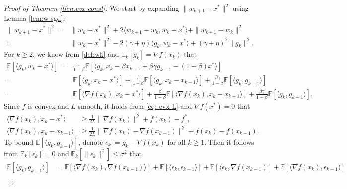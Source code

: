 \documentclass[10pt]{article}
\numberwithin{equation}{section}
\theoremstyle{definition}
\newcommand{\ebb}{\mathbb{E}}  %
\begin{document}
\begin{proof}[Proof of Theorem \ref{thm:cvx-const}]
We start by expanding $\|w_{k+1}-x^*\|^2$ using Lemma \ref{lem:w-sgd}:
\begin{equation}\label{eq:cvx-const-w}
\begin{aligned}
\|w_{k+1}-x^*\|^2=&\|w_k-x^*\|^2+2\langle w_{k+1}-w_k, w_k-x^*\rangle+\|w_{k+1}-w_k\|^2\\
= & \|w_k-x^*\|^2-2(\gamma+\eta)\langle g_k, w_k-x^*\rangle +(\gamma+\eta)^2\|g_k\|^2.
\end{aligned}
\end{equation}
For $k\ge 2$, we know from \eqref{def:wk} and $\ebb_k[g_k]=\nabla f(x_k)$ that
\begin{equation}\label{eq:cvx-const-ip}
    \begin{aligned}
        \ebb[\langle g_k, w_k-x^*\rangle] =&\frac{1}{1-\beta} \ebb[\langle g_k, x_k-\beta x_{k-1}+\beta \gamma g_{k-1}-(1-\beta) x^*\rangle]\\
        =&\ebb[\langle g_k, x_k-x^*\rangle] + \frac{\beta}{1-\beta}\ebb[\langle g_k, x_k-x_{k-1}\rangle] + \frac{\beta\gamma}{1-\beta}\ebb[\langle g_k, g_{k-1}\rangle]\\
        =&\ebb[\langle \nabla f(x_k), x_k-x^*\rangle] + \frac{\beta}{1-\beta}\ebb[\langle \nabla f(x_k), x_k-x_{k-1}\rangle] + \frac{\beta\gamma}{1-\beta}\ebb[\langle g_k, g_{k-1}\rangle].
    \end{aligned}
\end{equation}
Since $f$ is convex and $L$-smooth, it holds from \eqref{eq: cvx-L} and $\nabla f(x^*)=0$ that
\begin{align}
\langle\nabla f(x_k), x_k-x^*\rangle &\ge \frac{1}{2 L}\|\nabla f(x_k)\|^2+f(x_k)-f^* \label{eq:cvx-const-1},\\
\langle\nabla f(x_k), x_k-x_{k-1}\rangle &\ge \frac{1}{2 L}\|\nabla f(x_k)-\nabla f(x_{k-1})\|^2+f(x_k)-f(x_{k-1})\label{eq:cvx-const-2}.
\end{align}
To bound $\ebb[\langle g_k, g_{k-1}\rangle]$, denote $\epsilon_k:=g_k-\nabla f(x_k)$ for all $k\ge 1$. Then it follows from $\ebb_k[\epsilon_k]=0$ and $\ebb_k[\|\epsilon_k\|^2] \leq \sigma^2$ that
\begin{equation}\label{eq:cvx-const-3}
\begin{aligned}
\ebb[\langle g_k, g_{k-1}\rangle] & =\ebb[\langle\nabla f(x_k), \nabla f(x_{k-1})\rangle]+\ebb[\langle\epsilon_k, \epsilon_{k-1}\rangle]+\ebb[\langle\epsilon_k, \nabla f(x_{k-1})]+\ebb[\langle\nabla f(x_k), \epsilon_{k-1})] \\

\end{aligned}
\end{equation}
\end{proof}
\end{document}
